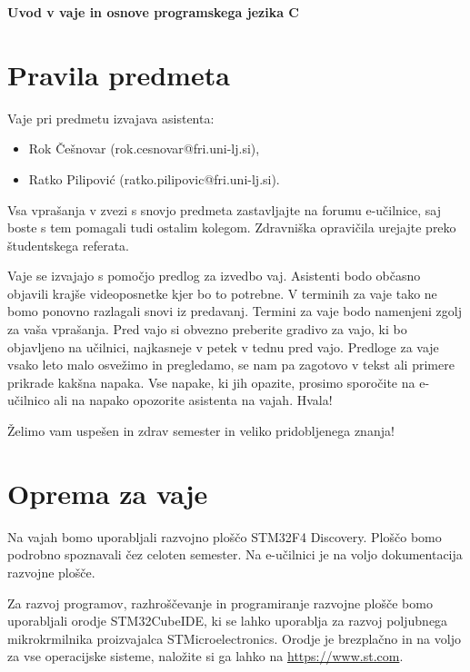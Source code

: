 \documentclass[12pt,letterpaper]{article}
\begin{document}
\begin{center}
    \textbf{\Large Uvod v vaje in osnove programskega jezika C}   
\end{center}


\section*{Pravila predmeta}

Vaje pri predmetu izvajava asistenta:
\begin{itemize}
    \item Rok Češnovar (rok.cesnovar@fri.uni-lj.si),
    \item Ratko Pilipović (ratko.pilipovic@fri.uni-lj.si).
\end{itemize}

Vsa vprašanja v zvezi s snovjo predmeta zastavljajte na forumu e-učilnice, saj boste s tem pomagali tudi ostalim kolegom. Zdravniška opravičila urejajte preko študentskega referata.

Vaje se izvajajo s pomočjo predlog za izvedbo vaj. Asistenti bodo občasno objavili krajše videoposnetke kjer bo to potrebne. V terminih za vaje tako ne bomo ponovno razlagali snovi iz predavanj. Termini za vaje bodo namenjeni zgolj za vaša vprašanja. Pred vajo si obvezno preberite gradivo za vajo, ki bo objavljeno na učilnici, najkasneje v petek v tednu pred vajo. Predloge za vaje vsako leto malo osvežimo in pregledamo, se nam pa zagotovo v tekst ali primere prikrade kakšna napaka. Vse napake, ki jih opazite, prosimo sporočite na e-učilnico ali na napako opozorite asistenta na vajah. Hvala!

Želimo vam uspešen in zdrav semester in veliko pridobljenega znanja!


\section*{Oprema za vaje}

Na vajah bomo uporabljali razvojno ploščo STM32F4 Discovery. Ploščo bomo podrobno spoznavali čez celoten semester. Na e-učilnici je na voljo dokumentacija razvojne plošče.

Za razvoj programov, razhroščevanje in programiranje razvojne plošče bomo uporabljali orodje STM32CubeIDE, ki se lahko uporablja za razvoj poljubnega mikrokrmilnika proizvajalca STMicroelectronics. Orodje je brezplačno in na voljo za vse operacijske sisteme, naložite si ga lahko na \href{https://www.st.com/en/development-tools/stm32cubeide.html}{https://www.st.com}.
\end{document}
